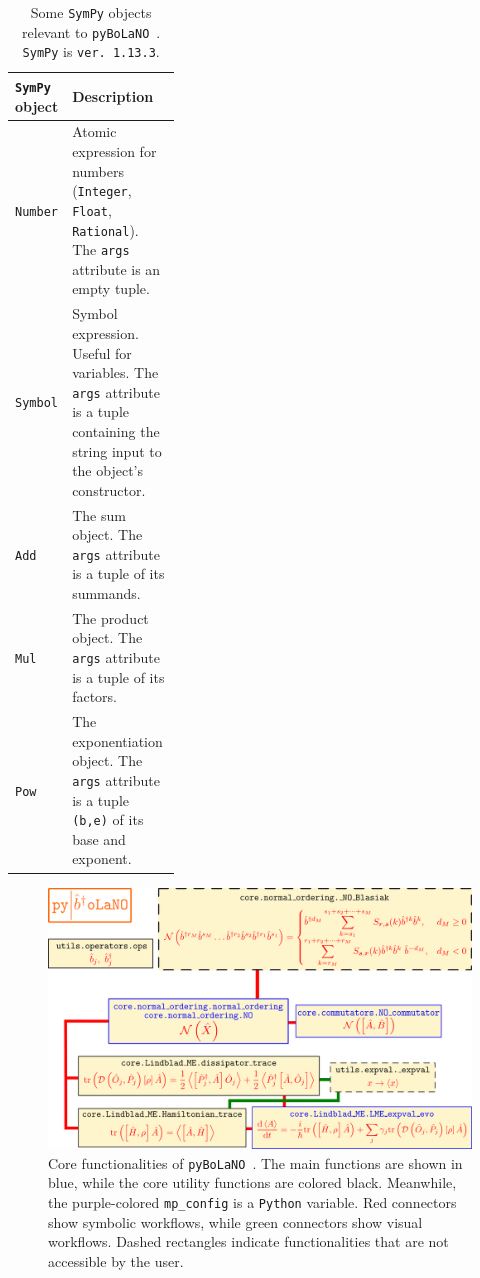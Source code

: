 \documentclass[5p, twocolumn, 10pt, sort&compress]{elsarticle}
\newcounter{bla}
\newcommand{\inlinecode}[1]{\texttt{#1}}
\newcommand{\pybolano}{\texttt{pyBoLaNO}~}
\newenvironment{revision}{}{}
\begin{document}
\begin{table}[!t]
\centering

\caption{Some \texttt{SymPy} objects \begin{revision}relevant to\end{revision} \pybolano. \texttt{SymPy} is \inlinecode{ver. 1.13.3}.}

\begin{tabular}{p{0.33\linewidth}|>{\raggedright\arraybackslash}p{}}
    \hline
    \hline
        \texttt{SymPy} object 
        & 
        Description
    \\
    \hline
    \hline
        \inlinecode{Number}
        &
        Atomic expression for numbers (\inlinecode{Integer}, \inlinecode{Float}, \inlinecode{Rational}). The \inlinecode{args} attribute is an empty tuple.
    \\
    \hline
        \inlinecode{Symbol}
        &
        Symbol expression. Useful for variables. The \inlinecode{args} attribute is a tuple containing the string input to the object's constructor.
    \\
    \hline
        \inlinecode{Add}
        &
        The sum object. The \inlinecode{args} attribute is a tuple of its summands.
    \\
    \hline
        \inlinecode{Mul}
        &
        The product object. The \inlinecode{args} attribute is a tuple of its factors.
    \\
    \hline
        \inlinecode{Pow}
        &
        The exponentiation object. The \inlinecode{args} attribute is a tuple \inlinecode{(b,e)} of its base and exponent.
    \\
    \hline
    \hline
\end{tabular}
\label{table_1}
\end{table}

\begin{figure}[!t]
    \centering
    \includegraphics[width=0.8\linewidth]{fig_1.png}
    \caption{Core functionalities of \pybolano. The main functions are shown in blue, while the core utility functions are colored black. Meanwhile, the purple-colored \inlinecode{mp_config} is a \texttt{Python} variable. Red connectors show symbolic workflows, while green connectors show visual workflows. Dashed rectangles indicate functionalities that are not accessible by the user.}
    \label{fig_1}
\end{figure}
\end{document}
